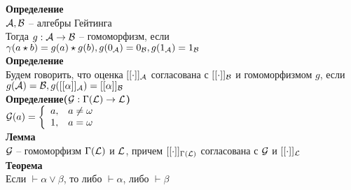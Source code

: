 \documentclass[12pt]{article}
\begin{document}
\textbf{Определение}\\
$\mathcal{A}, \mathcal{B}$ -- алгебры Гейтинга\\
Тогда $g: \mathcal{A}\rightarrow\mathcal{B}$ -- гомоморфизм, если $\gamma(a\star b) = g(a)\star g(b), g(0_\mathcal{A}) = 0_\mathcal{B}, g(1_\mathcal{A})=1_\mathcal{B}$\\
\textbf{Определение}\\
Будем говорить, что оценка $[[\cdot]]_\mathcal{A}$ согласована с $[[\cdot]]_\mathcal{B}$ и гомоморфизмом $g$, если $g(\mathcal{A}) = \mathcal{B}, g([[\alpha]]_\mathcal{A}) = [[\alpha]]_\mathcal{B}$\\
\textbf{Определение($\mathcal G: \Gamma(\mathcal L)\rightarrow \mathcal L$)}\\
$\mathcal G(a) = \left\{\begin{array}{cc}
    a, & a \neq \omega\\
    1, & a = \omega
\end{array}\right.$\\
\textbf{Лемма}\\
$\mathcal G$ -- гомоморфизм $\Gamma(\mathcal L)$ и $\mathcal L$, причем $[[\cdot]]_{\Gamma(\mathcal L)}$ согласована с $\mathcal G$ и $[[\cdot]]_{\mathcal L}$\\
\textbf{Теорема}\\
Если $\vdash \alpha \lor \beta$, то либо $\vdash \alpha$, либо $\vdash \beta$\\ 
\end{document}
